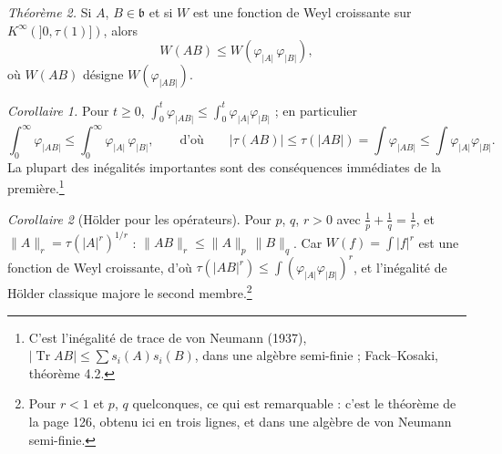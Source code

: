\documentclass[11pt,a4paper]{article}
\begin{document}
\emph{Théorème 2.} Si $A$, $B \in \mathfrak{b}$ et si $W$ est une fonction de
Weyl croissante sur $K^\infty(]0,\tau(1)])$, alors
\[
  W(AB) \leq W(\varphi_{|A|}\,\varphi_{|B|}),
\]
où $W(AB)$ désigne $W(\varphi_{|AB|})$.

\emph{Corollaire 1.} Pour $t \geq 0$, $\int_0^t \varphi_{|AB|} \leq \int_0^t
\varphi_{|A|}\varphi_{|B|}$ ; en particulier
\[
  \int_0^\infty \varphi_{|AB|} \leq \int_0^\infty \varphi_{|A|}\,\varphi_{|B|},
  \qquad\text{d'où}\qquad
  |\tau(AB)| \leq \tau(|AB|) = \int \varphi_{|AB|} \leq \int \varphi_{|A|}\varphi_{|B|} .
\]
La plupart des inégalités importantes sont des conséquences immédiates de
la première.\footnote{C'est l'inégalité de trace de von Neumann (1937),
$|\operatorname{Tr} AB| \leq \sum s_i(A)s_i(B)$, dans une algèbre semi-finie ;
Fack--Kosaki, théorème 4.2.}

\emph{Corollaire 2} (Hölder pour les opérateurs). Pour $p$, $q$, $r > 0$ avec
$\frac1p + \frac1q = \frac1r$, et $\|A\|_r = \tau(|A|^r)^{1/r}$ :
$\|AB\|_r \leq \|A\|_p\,\|B\|_q$. Car $W(f) = \int |f|^r$ est une fonction de
Weyl croissante, d'où $\tau(|AB|^r) \leq \int (\varphi_{|A|}\varphi_{|B|})^r$,
et l'inégalité de Hölder classique majore le second membre.\footnote{Pour
$r < 1$ et $p$, $q$ quelconques, ce qui est remarquable : c'est le théorème
de la page 126, obtenu ici en trois lignes, et dans une algèbre de von Neumann
semi-finie.}
\end{document}
